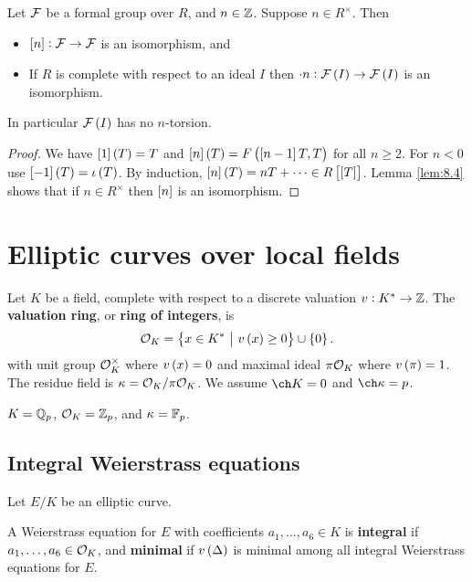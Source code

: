 \begin{corollary}
\label{cor:8.5}
Let $ \mathcal{F} $ be a formal group over $ R $, and $ n \in \mathbb{Z} $. Suppose $ n \in R^\times $. Then
\begin{itemize}
\item $ \sbr{n} : \FFF \to \FFF $ is an isomorphism, and
\item If $ R $ is complete with respect to an ideal $ I $ then $ \cdot n : \FFF\br{I} \to \FFF\br{I} $ is an isomorphism.
\end{itemize}
In particular $ \FFF\br{I} $ has no $ n $-torsion.
\end{corollary}

\begin{proof}
We have $ \sbr{1}\br{T} = T $ and $ \sbr{n}\br{T} = F\br{\sbr{n - 1}T, T} $ for all $ n \ge 2 $. For $ n < 0 $ use $ \sbr{-1}\br{T} = \iota\br{T} $. By induction, $ \sbr{n}\br{T} = nT + \dots \in R\sbr{\sbr{T}} $. Lemma \ref{lem:8.4} shows that if $ n \in R^\times $ then $ \sbr{n} $ is an isomorphism.
\end{proof}

\pagebreak

\section{Elliptic curves over local fields}

Let $ K $ be a field, complete with respect to a discrete valuation $ v : K^* \to \mathbb{Z} $. The \textbf{valuation ring}, or \textbf{ring of integers}, is
$$ \OOO_K = \cbr{x \in K^* \st v\br{x} \ge 0} \cup \cbr{0}. $$
with unit group $ \mathcal{O}_K^\times $ where $ v\br{x} = 0 $ and maximal ideal $ \pi\mathcal{O}_K $ where $ v\br{\pi} = 1 $. The residue field is $ \kappa = \mathcal{O}_K / \pi\mathcal{O}_K $. We assume $ \ch K = 0 $ and $ \ch \kappa = p $.

\begin{example*}
$ K = \mathbb{Q}_p $, $ \mathcal{O}_K = \mathbb{Z}_p $, and $ \kappa = \mathbb{F}_p $.
\end{example*}

\subsection{Integral Weierstrass equations}

Let $ E / K $ be an elliptic curve.

\begin{definition*}
A Weierstrass equation for $ E $ with coefficients $ a_1, \dots, a_6 \in K $ is \textbf{integral} if $ a_1, \dots, a_6 \in \mathcal{O}_K $, and \textbf{minimal} if $ v\br{\Delta} $ is minimal among all integral Weierstrass equations for $ E $.
\end{definition*}

